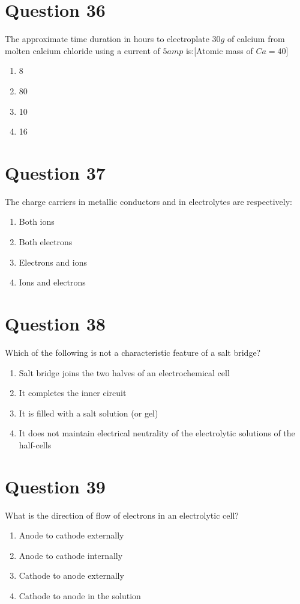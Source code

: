 \documentclass{article}
\begin{document}
\section*{Question 36}
The approximate time duration in hours to electroplate \(30 g\) of calcium from molten calcium chloride using a current of \(5 amp\) is:[Atomic mass of \(Ca =40\)]
\begin{enumerate}[label=(\alph*)]
\item 8
\item 80
\item 10
\item 16
\end{enumerate}
\newpage
\section*{Question 37}
The charge carriers in metallic conductors and in electrolytes are respectively:
\begin{enumerate}[label=(\alph*)]
\item Both ions
\item Both electrons
\item Electrons and ions
\item Ions and electrons
\end{enumerate}
\newpage
\section*{Question 38}
Which of the following is not a characteristic feature of a salt bridge?
\begin{enumerate}[label=(\alph*)]
\item Salt bridge joins the two halves of an electrochemical cell
\item It completes the inner circuit
\item It is filled with a salt solution (or gel)
\item It does not maintain electrical neutrality of the electrolytic solutions of the half-cells
\end{enumerate}
\newpage
\section*{Question 39}
What is the direction of flow of electrons in an electrolytic cell?
\begin{enumerate}[label=(\alph*)]
\item Anode to cathode externally
\item Anode to cathode internally
\item Cathode to anode externally
\item Cathode to anode in the solution
\end{enumerate}
\newpage
\end{document}
